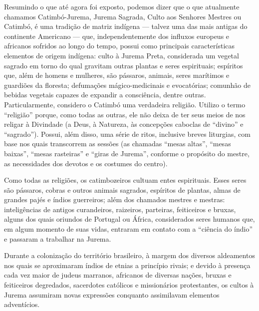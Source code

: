\begin{refsection}
    Resumindo o que até agora foi exposto, podemos dizer que o que atualmente chamamos Catimbó-Jurema, Jurema Sagrada, Culto aos Senhores Mestres ou Catimbó, é uma tradição de matriz indígena --- talvez uma das mais antigas do continente Americano --- que, independentemente dos influxos europeus e africanos sofridos ao longo do tempo, possui como principais características elementos de origem indígena: culto à Jurema Preta, considerada um vegetal sagrado em torno do qual gravitam outras plantas e seres espirituais; espíritos que, além de homens e mulheres, são pássaros, animais, seres marítimos e guardiões da floresta; defumações mágico-medicinais e evocatórias; comunhão de bebidas vegetais capazes de expandir a consciência, dentre outras. Particularmente, considero o Catimbó uma verdadeira religião. Utilizo o termo ``religião'' porque, como todas as outras, ele não deixa de ter seus meios de nos religar à Divindade (a Deus, à Natureza, às concepções caboclas de ``divino'' e ``sagrado''). Possui, além disso, uma série de ritos, inclusive breves liturgias, com base nos quais transcorrem as sessões (as chamadas ``mesas altas'', ``mesas baixas'', ``mesas rasteiras'' e ``giras de Jurema'', conforme o propósito do mestre, as necessidades dos devotos e os costumes do centro).  

    Como todas as religiões, os catimbozeiros cultuam entes espirituais. Esses seres são pássaros, cobras e outros animais sagrados, espíritos de plantas, almas de grandes pajés e índios guerreiros; além dos chamados mestres e mestras: inteligências de antigos curandeiros, raizeiros, parteiras, feiticeiros e bruxas, alguns dos quais oriundos de Portugal ou África, considerados seres humanos que, em algum momento de suas vidas, entraram em contato com a ``ciência do índio'' e passaram a trabalhar na Jurema. 

    Durante a colonização do território brasileiro, à margem dos diversos aldeamentos nos quais se aproximaram índios de etnias a princípio rivais; e devido à presença cada vez maior de judeus marranos, africanos de diversas nações, bruxas e feiticeiros degredados, sacerdotes católicos e missionários protestantes, os cultos à Jurema assumiram novas expressões conquanto assimilavam elementos adventícios. 


\end{refsection}

